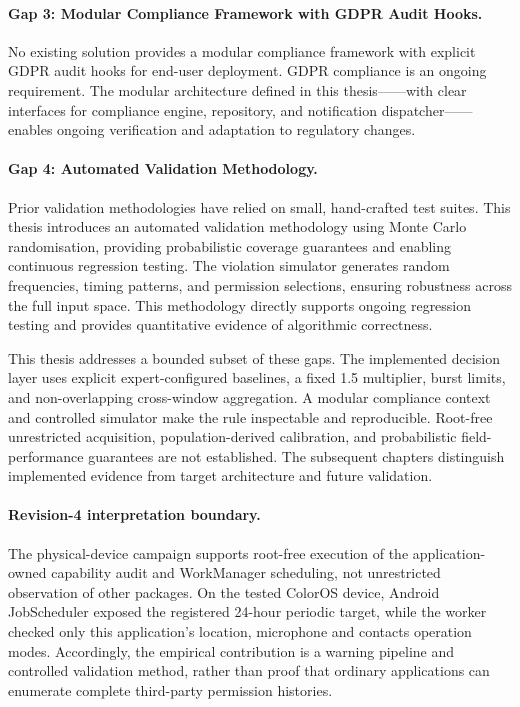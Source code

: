 \paragraph{Gap 3: Modular Compliance Framework with GDPR Audit Hooks.} No existing solution provides a modular compliance framework with explicit GDPR audit hooks for end-user deployment. GDPR compliance is an ongoing requirement. The modular architecture defined in this thesis——with clear interfaces for compliance engine, repository, and notification dispatcher——enables ongoing verification and adaptation to regulatory changes.

\paragraph{Gap 4: Automated Validation Methodology.} Prior validation methodologies have relied on small, hand-crafted test suites. This thesis introduces an automated validation methodology using Monte Carlo randomisation, providing probabilistic coverage guarantees and enabling continuous regression testing. The violation simulator generates random frequencies, timing patterns, and permission selections, ensuring robustness across the full input space. This methodology directly supports ongoing regression testing and provides quantitative evidence of algorithmic correctness.

This thesis addresses a bounded subset of these gaps. The implemented decision layer uses explicit expert-configured baselines, a fixed 1.5 multiplier, burst limits, and non-overlapping cross-window aggregation. A modular compliance context and controlled simulator make the rule inspectable and reproducible. Root-free unrestricted acquisition, population-derived calibration, and probabilistic field-performance guarantees are not established. The subsequent chapters distinguish implemented evidence from target architecture and future validation.
\paragraph{Revision-4 interpretation boundary.}
The physical-device campaign supports root-free execution of the application-owned capability audit and WorkManager scheduling, not unrestricted observation of other packages. On the tested ColorOS device, Android JobScheduler exposed the registered 24-hour periodic target, while the worker checked only this application's location, microphone and contacts operation modes. Accordingly, the empirical contribution is a warning pipeline and controlled validation method, rather than proof that ordinary applications can enumerate complete third-party permission histories.
